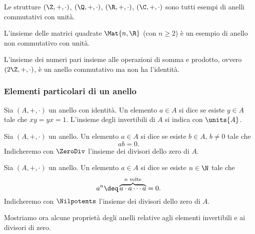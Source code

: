 \begin{example}
    Le strutture $(\Z, +, \cdot)$, $(\Q, +, \cdot)$, $(\R, +, \cdot)$, $(\C, +, \cdot)$ sono tutti esempi di anelli commutativi con unità.
\end{example}
\begin{example}
    L'insieme delle matrici quadrate $\Mat{n, \R}$ (con $n \geq 2$) è un esempio di anello non commutativo con unità.
\end{example}
\begin{example}
    L'insieme dei numeri pari insieme alle operazioni di somma e prodotto, ovvero $(2\Z, +, \cdot)$, è un anello commutativo ma non ha l'identità.
\end{example}

\subsubsection{Elementi particolari di un anello}

\begin{definition} 
    \label{def:units}
    Sia $(A, +, \cdot)$ un anello con identità. Un elemento $a \in A$ si dice  se esiste $y \in A$ tale che $xy = yx = 1$. L'insieme degli invertibili di $A$ si indica con $\units{A}$.
\end{definition}

\begin{definition} 
    \label{def:zero_divisor}
    Sia $(A, +, \cdot)$ un anello. Un elemento $a \in A$ si dice  se esiste $b \in A$, $b \neq 0$ tale che \[
        ab = 0.
    \] Indicheremo con $\ZeroDiv$ l'insieme dei divisori dello zero di $A$.
\end{definition}

\begin{definition} [Nilpotenti]
    Sia $(A, +, \cdot)$ un anello. Un elemento $a \in A$ si dice  se esiste $n \in \N$ tale che \[
        a^n \deq \overbrace{a \cdot a \cdots a}^{n\text{ volte}} = 0.
    \] Indicheremo con $\Nilpotents$ l'insieme dei divisori dello zero di $A$.
\end{definition}

Mostriamo ora alcune proprietà degli anelli relative agli elementi invertibili e ai divisori di zero.


